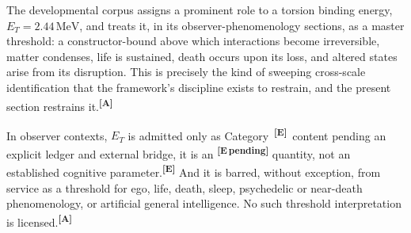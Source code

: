 \documentclass[12pt,a4paper,twoside]{article}
\theoremstyle{plain}
\theoremstyle{definition}
\theoremstyle{remark}
\newcommand{\MeV}{\,\mathrm{MeV}}
\newcommand{\catmark}[1]{\textsuperscript{\textsf{\textbf{[#1]}}}}
\newcommand{\ETorsion}{2.44\MeV} %
\begin{document}
The developmental corpus assigns a prominent role to a torsion binding energy, $E_T = \ETorsion$, and treats it, in its observer-phenomenology sections, as a master threshold: a constructor-bound above which interactions become irreversible, matter condenses, life is sustained, death occurs upon its loss, and altered states arise from its disruption. This is precisely the kind of sweeping cross-scale identification that the framework's discipline exists to restrain, and the present section restrains it.\catmark{A}

In observer contexts, $E_T$ is admitted only as Category~\catmark{E}\ content pending an explicit ledger and external bridge, it is an \catmark{E\,pending} quantity, not an established cognitive parameter.\catmark{E} And it is barred, without exception, from service as a threshold for ego, life, death, sleep, psychedelic or near-death phenomenology, or artificial general intelligence. No such threshold interpretation is licensed.\catmark{A}
\end{document}
